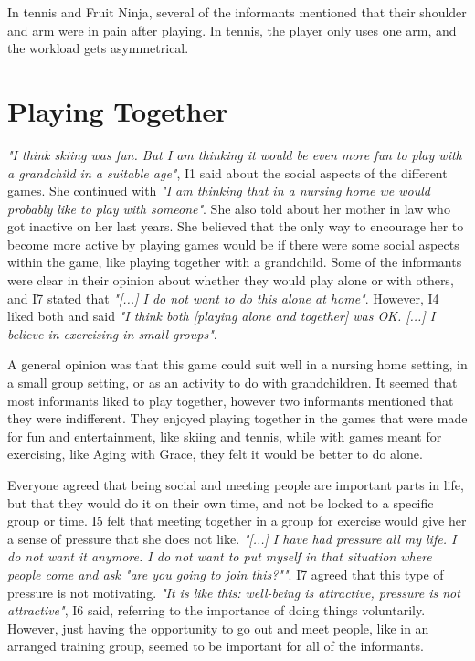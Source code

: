 In tennis and Fruit Ninja, several of the informants mentioned that their shoulder and arm were in pain after playing. In tennis, the player only uses one arm, and the workload gets asymmetrical.  
    
\section{Playing Together}
\emph{"I think skiing was fun. But I am thinking it would be even more fun to play with a grandchild in a suitable age"}, I1 said about the social aspects of the different games. She continued with \emph{"I am thinking that in a nursing home we would probably like to play with someone"}. She also told about her mother in law who got inactive on her last years. She believed that the only way to encourage her to become more active by playing games would be if there were some social aspects within the game, like playing together with a grandchild. Some of the informants were clear in their opinion about whether they would play alone or with others, and I7 stated that \emph{"[...] I do not want to do this alone at home"}. However, I4 liked both and said \emph{"I think both [playing alone and together] was OK. [...] I believe in  exercising in small groups"}.

A general opinion was that this game could suit well in a nursing home setting, in a small group setting, or as an activity to do with grandchildren. It seemed that most informants liked to play together, however two informants mentioned that they were indifferent. They enjoyed playing together in the games that were made for fun and entertainment, like skiing and tennis, while with games meant for exercising, like Aging with Grace, they felt it would be better to do alone.  

Everyone agreed that being social and meeting people are important parts in life, but that they would do it on their own time, and not be locked to a specific group or time. I5 felt that meeting together in a group for exercise would give her a sense of pressure that she does not like. \emph{"[...] I have had pressure all my life. I do not want it anymore. I do not want to put myself in that situation where people come and ask "are you going to join this?""}. I7 agreed that this type of pressure is not motivating. \emph{"It is like this: well-being is attractive, pressure is not attractive"}, I6 said, referring to the importance of doing things voluntarily. However, just having the opportunity to go out and meet people, like in an arranged training group, seemed to be important for all of the informants. 

